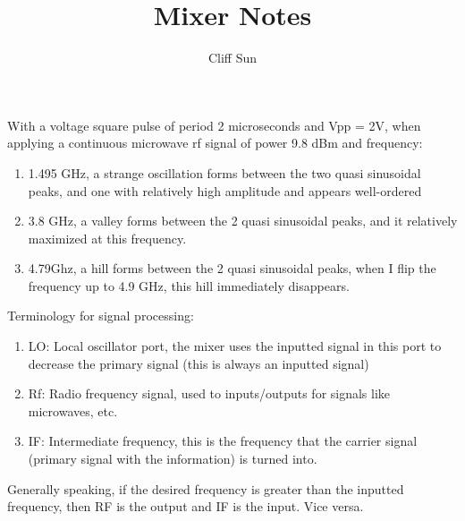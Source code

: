 \documentclass{article}
\title{Mixer Notes}
\author{Cliff Sun}
\begin{document}
\maketitle

With a voltage square pulse of period 2 microseconds and Vpp = 2V, when applying a continuous microwave rf signal of power 9.8 dBm and frequency:

\begin{enumerate}
    \item 1.495 GHz, a strange oscillation forms between the two quasi sinusoidal peaks, and one with relatively high amplitude and appears well-ordered
    \item 3.8 GHz, a valley forms between the 2 quasi sinusoidal peaks, and it relatively maximized at this frequency. 
    \item 4.79Ghz, a hill forms between the 2 quasi sinusoidal peaks, when I flip the frequency up to 4.9 GHz, this hill immediately disappears.
\end{enumerate}

Terminology for signal processing:

\begin{enumerate}
    \item LO: Local oscillator port, the mixer uses the inputted signal in this port to decrease the primary signal (this is always an inputted signal)
    \item Rf: Radio frequency signal, used to inputs/outputs for signals like microwaves, etc.
    \item IF: Intermediate frequency, this is the frequency that the carrier signal (primary signal with the information) is turned into. 
\end{enumerate}

Generally speaking, if the desired frequency is greater than the inputted frequency, then RF is the output and IF is the input. Vice versa.
\end{document}
